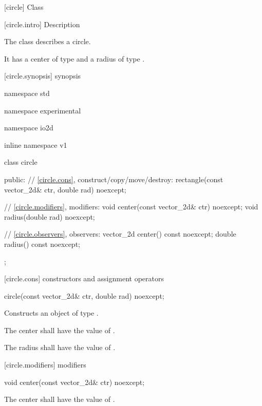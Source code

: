  [circle] {Class }

 [circle.intro] { Description}

\pnum
{}
The class  describes a circle.

\pnum
It has a center of type  and a radius of type .

 [circle.synopsis] { synopsis}

\begin{codeblock}
namespace std { namespace experimental { namespace io2d { inline namespace v1 {
  class circle {
  public:
    // \ref{circle.cons}, construct/copy/move/destroy:
    rectangle(const vector_2d& ctr, double rad) noexcept;

    // \ref{circle.modifiers}, modifiers:
    void center(const vector_2d& ctr) noexcept;
    void radius(double rad) noexcept;
    
    // \ref{circle.observers}, observers:
    vector_2d center() const noexcept;
    double radius() const noexcept;
  };
} } } }
\end{codeblock}

 [circle.cons] { constructors and assignment operators}

\begin{itemdecl}
circle(const vector_2d& ctr, double rad) noexcept;
\end{itemdecl}
\begin{itemdescr}
	\pnum
	\effects
	Constructs an object of type .
	
	\pnum
	The center shall have the value of .
	
	\pnum
	The radius shall have the value of .
\end{itemdescr}

 [circle.modifiers]{ modifiers}

\begin{itemdecl}
void center(const vector_2d& ctr) noexcept;
\end{itemdecl}

\begin{itemdescr}
	\pnum
	\effects
	The center shall have the value of .
\end{itemdescr}

